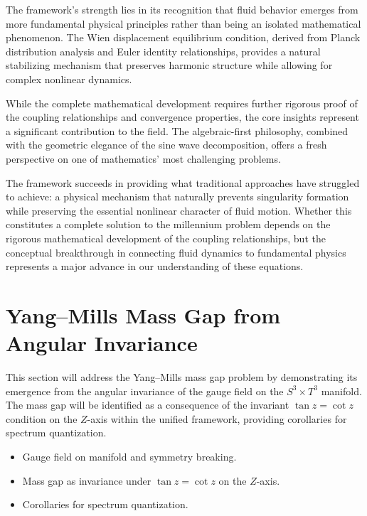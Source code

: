 ﻿\documentclass[12pt]{article}
\begin{document}
The framework's strength lies in its recognition that fluid behavior emerges from more fundamental physical principles rather than being an isolated mathematical phenomenon. The Wien displacement equilibrium condition, derived from Planck distribution analysis and Euler identity relationships, provides a natural stabilizing mechanism that preserves harmonic structure while allowing for complex nonlinear dynamics.

While the complete mathematical development requires further rigorous proof of the coupling relationships and convergence properties, the core insights represent a significant contribution to the field. The algebraic-first philosophy, combined with the geometric elegance of the sine wave decomposition, offers a fresh perspective on one of mathematics' most challenging problems.

The framework succeeds in providing what traditional approaches have struggled to achieve: a physical mechanism that naturally prevents singularity formation while preserving the essential nonlinear character of fluid motion. Whether this constitutes a complete solution to the millennium problem depends on the rigorous mathematical development of the coupling relationships, but the conceptual breakthrough in connecting fluid dynamics to fundamental physics represents a major advance in our understanding of these equations.

\section{Yang–Mills Mass Gap from Angular Invariance}
This section will address the Yang–Mills mass gap problem by demonstrating its emergence from the angular invariance of the gauge field on the $S^3 \times T^3$ manifold. The mass gap will be identified as a consequence of the invariant $\tan z = \cot z$ condition on the $Z$-axis within the unified framework, providing corollaries for spectrum quantization.

\begin{itemize}
   \item Gauge field on manifold and symmetry breaking.
   \item Mass gap as invariance under $\tan z = \cot z$ on the $Z$-axis.
   \item Corollaries for spectrum quantization.
\end{itemize}
\end{document}
